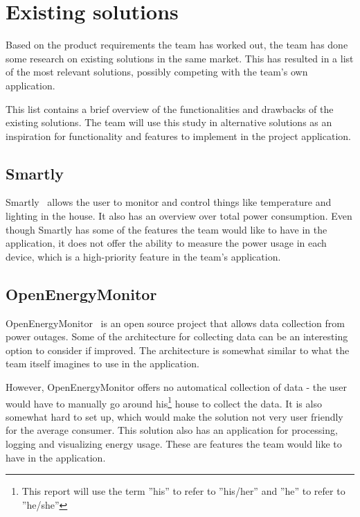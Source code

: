 \section{Existing solutions}
\label{sec:altsolution}
Based on the product requirements the team has worked out, the team has done some research on existing solutions in the same market. This has resulted in a list of the most relevant solutions, possibly competing with the team's own application.
 
This list contains a brief overview of the functionalities and drawbacks of the existing solutions. The team will use this study in alternative solutions as an inspiration for functionality and features to implement in the project application.

\subsection{Smartly}

Smartly~\cite{smartly} allows the user to monitor and control things like temperature and lighting in the house. It also has an overview over total power consumption. Even though Smartly has some of the features the team would like to have in the application, it does not offer the ability to measure the power usage in each device, which is a high-priority feature in the team's application.

\subsection{OpenEnergyMonitor}

OpenEnergyMonitor~\cite{openenergymonitor} is an open source project that allows data collection from power outages. Some of the architecture for collecting data can be an interesting option to consider if improved. The architecture is somewhat similar to what the team itself imagines to use in the application. 

However, OpenEnergyMonitor offers no automatical collection of data - the user would have to manually go around his\footnote{This report will use the term ''his'' to refer to ''his/her'' and ''he'' to refer to ''he/she''} house to collect the data. It is also somewhat hard to set up, which would make the solution not very user friendly for the average consumer. This solution also has an application for processing, logging and visualizing energy usage. These are features the team would like to have in the application.


